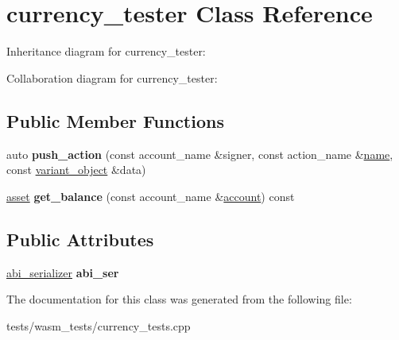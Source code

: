 \hypertarget{classcurrency__tester}{}\section{currency\+\_\+tester Class Reference}
\label{classcurrency__tester}


Inheritance diagram for currency\+\_\+tester\+:


Collaboration diagram for currency\+\_\+tester\+:
\subsection*{Public Member Functions}
\begin{DoxyCompactItemize}
\item 
\mbox{\label{classcurrency__tester_a89f9e02b0bd947363745517c9e674a6a}} 
auto {\bfseries push\+\_\+action} (const account\+\_\+name \&signer, const action\+\_\+name \&\mbox{\hyperlink{structaacio_1_1name}{name}}, const \mbox{\hyperlink{classfc_1_1variant__object}{variant\+\_\+object}} \&data)
\item 
\mbox{\label{classcurrency__tester_a42070b2c8962404b69e13ea744b359b4}} 
\mbox{\hyperlink{structaacio_1_1asset}{asset}} {\bfseries get\+\_\+balance} (const account\+\_\+name \&\mbox{\hyperlink{structaccount}{account}}) const
\end{DoxyCompactItemize}
\subsection*{Public Attributes}
\begin{DoxyCompactItemize}
\item 
\mbox{\label{classcurrency__tester_a12dcd42e15b334ac5e02fc15816269c6}} 
\mbox{\hyperlink{structaacio_1_1chain_1_1contracts_1_1abi__serializer}{abi\+\_\+serializer}} {\bfseries abi\+\_\+ser}
\end{DoxyCompactItemize}


The documentation for this class was generated from the following file\+:\begin{DoxyCompactItemize}
\item 
tests/wasm\+\_\+tests/currency\+\_\+tests.\+cpp\end{DoxyCompactItemize}
